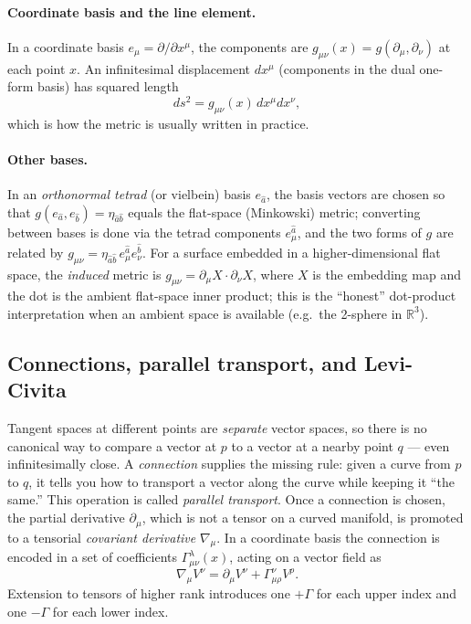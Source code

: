 \documentclass[12pt]{article}
\begin{document}
\paragraph{Coordinate basis and the line element.}  In a coordinate
basis $e_\mu = \partial/\partial x^\mu$, the components are
$g_{\mu\nu}(x) = g(\partial_\mu,\partial_\nu)$ at each point $x$.
An infinitesimal displacement $dx^\mu$ (components in the dual
one-form basis) has squared length
%
\begin{equation}
  ds^2 = g_{\mu\nu}(x)\,dx^\mu dx^\nu,
\end{equation}
%
which is how the metric is usually written in practice.

\paragraph{Other bases.}  In an \emph{orthonormal tetrad} (or
vielbein) basis $e_{\hat a}$, the basis vectors are chosen so that
$g(e_{\hat a}, e_{\hat b}) = \eta_{\hat a\hat b}$ equals the flat-space
(Minkowski) metric; converting between bases is done via the tetrad
components $e^{\hat a}_\mu$, and the two forms of $g$ are related by
$g_{\mu\nu} = \eta_{\hat a\hat b}\,e^{\hat a}_\mu e^{\hat b}_\nu$.  For
a surface embedded in a higher-dimensional flat space, the
\emph{induced} metric is $g_{\mu\nu} = \partial_\mu X\cdot\partial_\nu X$,
where $X$ is the embedding map and the dot is the ambient flat-space
inner product; this is the ``honest'' dot-product interpretation
when an ambient space is available (e.g.\ the 2-sphere in $\mathbb{R}^3$).

\subsection{Connections, parallel transport, and Levi-Civita}
\label{app:connection}

Tangent spaces at different points are \emph{separate} vector spaces,
so there is no canonical way to compare a vector at $p$ to a vector
at a nearby point $q$ --- even infinitesimally close.  A
\emph{connection} supplies the missing rule: given a curve from $p$
to $q$, it tells you how to transport a vector along the curve while
keeping it ``the same.''  This operation is called
\emph{parallel transport}.  Once a connection is chosen, the partial
derivative $\partial_\mu$, which is not a tensor on a curved
manifold, is promoted to a tensorial \emph{covariant derivative}
$\nabla_\mu$.  In a coordinate basis the connection is encoded in a
set of coefficients $\Gamma^\lambda_{\mu\nu}(x)$, acting on a vector
field as
%
\begin{equation}
  \nabla_\mu V^\nu
  = \partial_\mu V^\nu + \Gamma^\nu_{\mu\rho}V^\rho.
\end{equation}
%
Extension to tensors of higher rank introduces one $+\Gamma$ for each
upper index and one $-\Gamma$ for each lower index.
\end{document}
